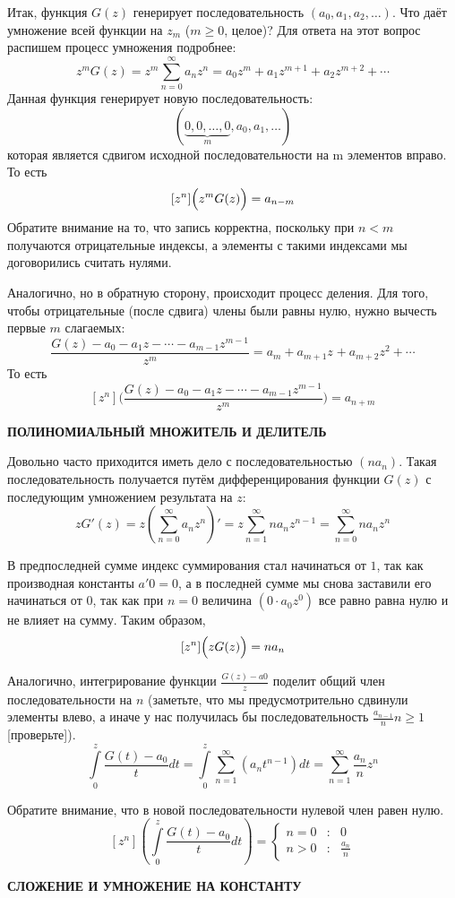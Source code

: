 \documentclass[12pt, letterpaper]{extarticle}
\begin{document}
Итак, функция $G(z)$ генерирует последовательность $(a_0, a_1, a_2, \dotsc)$. Что даёт умножение всей функции на $z_m$ ($m\geq0$, целое)? Для ответа на этот вопрос распишем процесс умножения подробнее:
\[z^mG(z)=z^m\sum_{n=0}^{\infty} a_nz^n = a_0z^m+a_1z^{m+1}+a_2z^{m+2}+\dotsb\]
Данная функция генерирует новую последовательность:
\[(\underbrace{0,0,\dotsc,0}_m,a_0, a_1, \dotsc)\]
которая является сдвигом исходной последовательности на m элементов вправо. То есть
\[[z^n]\Bigl( z^mG(z) \Bigr) = a_{n-m}\]
Обратите внимание на то, что запись корректна, поскольку при $n<m$ получаются отрицательные индексы, а элементы с такими индексами мы договорились считать нулями.

Аналогично, но в обратную сторону, происходит процесс деления. Для того, чтобы отрицательные (после сдвига) члены были равны нулю, нужно вычесть первые $m$ слагаемых:
\[\frac{G(z)-a_0-a_1z-\dotsb-a_{m-1}z^{m-1}}{z^m} = a_m+a_{m+1}z^{}+a_{m+2}{z^{2}}+\dotsb\]
То есть
\[[z^n]\Biggl( \frac{G(z)-a_0-a_1z-\dotsb-a_{m-1}z^{m-1}}{z^m} \Biggr) = a_{n+m}\]
\begin{center}
  \textbf{ПОЛИНОМИАЛЬНЫЙ МНОЖИТЕЛЬ И ДЕЛИТЕЛЬ}
\end{center}

Довольно часто приходится иметь дело с последовательностью $(na_n)$. Такая последовательность получается путём дифференцирования функции $G(z)$ с последующим умножением результата на $z$:
\[zG'(z) = z\left(\sum_{n=0}^{\infty}a_nz^n\right)' = z\sum_{n=1}^{\infty}na_nz^{n-1} = \sum_{n=0}^{\infty}na_nz^{n}\]

В предпоследней сумме индекс суммирования стал начинаться от $1$, так как производная константы $a'0=0$, а в последней сумме мы снова заставили его начинаться от $0$, так как при $n=0$ величина $(0\cdot a_0z^0)$ все равно равна нулю и не влияет на сумму. Таким образом,
\[[z^n]\Bigl( zG(z) \Bigr) = na_{n}\]

Аналогично, интегрирование функции $\frac{G(z)-a0}{z}$ поделит общий член последовательности на $n$ (заметьте, что мы предусмотрительно сдвинули элементы влево, а иначе у нас получилась бы последовательность $\frac{a_{n-1}}{n}n\geq1$ [проверьте]).
\[\int\limits_0^z \frac{G(t)-a_0}{t} dt = \int\limits_0^z\sum_{n=1}^{\infty}\left(a_nt^{n-1}\right)dt=\sum_{n=1}^{\infty}\frac{a_n}{n}z^{n}\]

Обратите внимание, что в новой последовательности нулевой член равен нулю.
\[[z^n]\left(\int\limits_0^z\frac{G(t)-a_0}{t}dt\right)=\left\{\begin{array}{rcl}n=0&:&0 \\[7pt] n>0&:&\frac{a_n}{n}\end{array}\right.\]
\newpage
\begin{center}
  \textbf{СЛОЖЕНИЕ И УМНОЖЕНИЕ НА КОНСТАНТУ}
\end{center}
\end{document}
